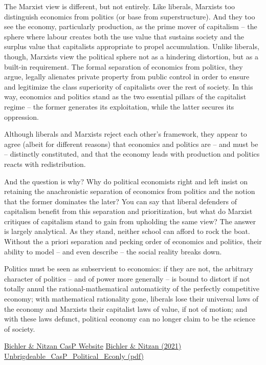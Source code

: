 \documentclass[
]{book}
\begin{document}
The Marxist view is different, but not entirely. Like liberals, Marxists too distinguish economics
from politics (or base from superstructure). And they too see the economy, particularly
production, as the prime mover of capitalism -- the sphere where labour creates both the use
value that sustains society and the surplus value that capitalists appropriate to propel
accumulation. Unlike liberals, though, Marxists view the political sphere not as a hindering
distortion, but as a built-in requirement. The formal separation of economics from politics, they
argue, legally alienates private property from public control in order to ensure and legitimize
the class superiority of capitalists over the rest of society. In this way, economics and politics
stand as the two essential pillars of the capitalist regime -- the former generates its
exploitation, while the latter secures its oppression.

Although liberals and Marxists reject each
other's framework, they appear to agree (albeit for different reasons) that economics and
politics are -- and must be -- distinctly constituted, and that the economy leads with production
and politics reacts with redistribution.

And the question is why? Why do political economists right and left insist on retaining the
anachronistic separation of economics from politics and the notion that the former dominates
the later? You can say that liberal defenders of capitalism benefit from this separation and
prioritization, but what do Marxist critiques of capitalism stand to gain from upholding the
same view? The answer is largely analytical. As they stand, neither school can afford to rock
the boat. Without the a priori separation and pecking order of economics and politics, their
ability to model -- and even describe -- the social reality breaks down.

Politics must be seen as subservient to economics: if they are not, the
arbitrary character of politics -- and of power more generally -- is bound to distort if not totally
annul the rational-mathematical automaticity of the perfectly competitive economy; with
mathematical rationality gone, liberals lose their universal laws of the economy and Marxists
their capitalist laws of value, if not of motion; and with these laws defunct, political economy
can no longer claim to be the science of society.

\href{https://capitalaspower.com/}{Bichler \& Nitzan CasP Website}
\href{Bichler_Nitzan_2021_Unbridgeable_RWER95.pdf}{Bichler \& Nitzan (2021) Unbrigdeable\_CasP\_Political\_Econly (pdf)}
\end{document}
